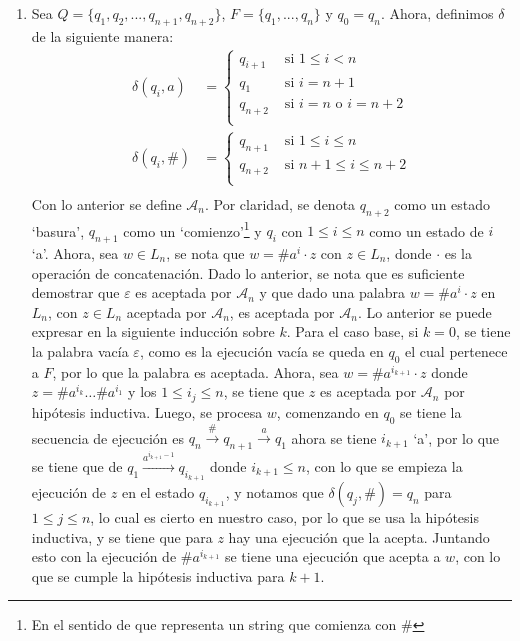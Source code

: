 \documentclass{homework}
\begin{document}
\begin{p1}
    \begin{sol}
        \begin{enumerate}
            \item Sea \(Q=\{q_1,q_2,...,q_{n+1},q_{n+2}\}\), \(F=\{q_1,...,q_n\}\) y \(q_0=q_n\). Ahora, definimos \(\delta\) de la siguiente manera:
                  \begin{align*}
                      \delta(q_i,a)  & =\begin{cases}
                          q_{i+1} & \text{ si }1\leq i<n           \\
                          q_{1}   & \text{ si }i=n+1               \\
                          q_{n+2} & \text{ si }i=n\text{ o } i=n+2 \\
                      \end{cases} \\
                      \delta(q_i,\#) & =\begin{cases}
                          q_{n+1} & \text{ si }1\leq i\leq n     \\
                          q_{n+2} & \text{ si }n+1\leq i\leq n+2 \\
                      \end{cases} \\
                  \end{align*}
                  Con lo anterior se define \(\mathcal{A}_n\). Por claridad, se denota \(q_{n+2}\) como un estado `basura', \(q_{n+1}\) como un `comienzo'\footnote{En el sentido de que representa un string que comienza con \(\#\)} y \(q_i\) con \(1\leq i\leq n\) como un estado de \(i\) `a'. Ahora, sea \(w\in L_n\), se nota que \(w=\#a^i\cdot z\) con \(z\in L_n\), donde \(\cdot\) es la operación de concatenación. Dado lo anterior, se nota que es suficiente demostrar que \(\varepsilon\) es aceptada por \(\mathcal{A}_n\) y que dado una palabra \(w=\#a^i\cdot z\) en \(L_n\), con \(z\in L_n\) aceptada por \(\mathcal{A}_n\), es aceptada por \(\mathcal{A}_n\). Lo anterior se puede expresar en la siguiente inducción sobre \(k\). Para el caso base, si \(k=0\), se tiene la palabra vacía \(\varepsilon\), como es la ejecución vacía se queda en \(q_0\) el cual pertenece a \(F\), por lo que la palabra es aceptada. Ahora, sea \(w=\#a^{i_{k+1}}\cdot z\) donde \(z=\#a^{i_k}\dots\#a^{i_1}\) y los \(1\leq i_j\leq n\), se tiene que \(z\) es aceptada por \(\mathcal{A}_n\) por hipótesis inductiva. Luego, se procesa \(w\), comenzando en \(q_0\) se tiene la secuencia de ejecución es \(q_n\xrightarrow{\#} q_{n+1}\xrightarrow{a} q_1\) ahora se tiene \(i_{k+1}\) `a', por lo que se tiene que de \(q_1\xrightarrow{a^{i_{k+1}-1}}q_{i_{k+1}}\) donde \(i_{k+1}\leq n\), con lo que se empieza la ejecución de \(z\) en el estado \(q_{i_{k+1}}\), y notamos que \(\delta(q_j,\#)=q_n\) para \(1\leq j\leq n\), lo cual es cierto en nuestro caso, por lo que se usa la hipótesis inductiva, y se tiene que para \(z\) hay una ejecución que la acepta. Juntando esto con la ejecución de \(\#a^{i_{k+1}}\) se tiene una ejecución que acepta a \(w\), con lo que se cumple la hipótesis inductiva para \(k+1\).
    

\end{enumerate}
\end{sol}
\end{p1}
\end{document}
